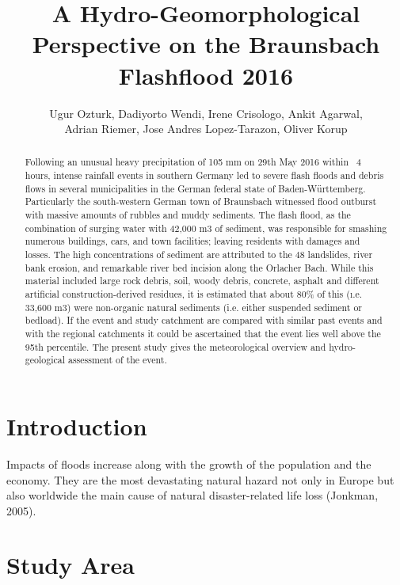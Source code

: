 \documentclass[10pt]{article}
\begin{document}
\title{A Hydro-Geomorphological Perspective on the Braunsbach Flashflood 2016}
\author{Ugur Ozturk, Dadiyorto Wendi, Irene Crisologo, Ankit Agarwal, \\
Adrian Riemer, Jose Andres Lopez-Tarazon, Oliver Korup}
\date{}

\maketitle

\begin{abstract}

Following an unusual heavy precipitation of 105 mm on 29th May 2016 within ~4 hours, intense rainfall events in southern Germany led to severe flash floods and debris flows in several municipalities in the German federal state of Baden-W{\"u}rttemberg. Particularly the south-western German town of Braunsbach witnessed flood outburst with massive amounts of rubbles and muddy sediments. The flash flood, as the combination of surging water with 42,000 m3 of sediment, was responsible for smashing numerous buildings, cars, and town facilities; leaving residents with damages and losses. The high concentrations of sediment are attributed to the 48 landslides, river bank erosion, and remarkable river bed incision along the Orlacher Bach.  While this material included large rock debris, soil, woody debris, concrete, asphalt and different artificial construction-derived residues, it is estimated that about 80\% of this (\i.e. 33,600 m3) were non-organic natural sediments (i.e. either suspended sediment or bedload). If the event and study catchment are compared with similar past events and with the regional catchments it could be ascertained that the event lies well above the 95th percentile. The present study gives the meteorological overview and hydro-geological assessment of the event.

\end{abstract}

\section{Introduction}

Impacts of floods increase along with the growth of the population and the economy. They are the most devastating natural hazard not only in Europe but also worldwide the main cause of natural disaster-related life loss (Jonkman, 2005).

\section{Study Area}
\end{document}
